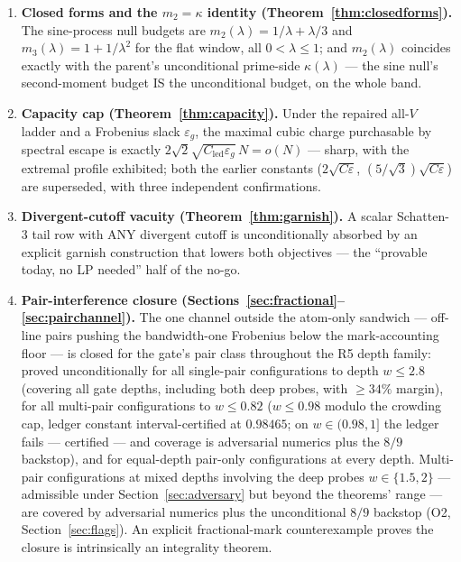 \documentclass[11pt]{article}
\theoremstyle{plain}
\theoremstyle{definition}
\theoremstyle{remark}
\newcommand{\Cled}{C_{\mathrm{led}}}
\begin{document}
\begin{enumerate}
\item \textbf{Closed forms and the $m_2 = \kappa$ identity
(Theorem~\ref{thm:closedforms}).} The sine-process null budgets are
$m_2(\lambda) = 1/\lambda + \lambda/3$ and $m_3(\lambda) = 1 + 1/\lambda^2$ for
the flat window, all $0 < \lambda \le 1$; and $m_2(\lambda)$ coincides exactly
with the parent's unconditional prime-side $\kappa(\lambda)$ --- the sine null's
second-moment budget IS the unconditional budget, on the whole band.

\item \textbf{Capacity cap (Theorem~\ref{thm:capacity}).} Under the repaired
all-$V$ ladder and a Frobenius slack $\varepsilon_g$, the maximal cubic charge
purchasable by spectral escape is exactly
$2\sqrt{2}\sqrt{\Cled \varepsilon_g}\,N = o(N)$ --- sharp, with the extremal
profile exhibited; both the earlier constants
($2\sqrt{C\varepsilon}$, $(5/\sqrt{3})\sqrt{C\varepsilon}$) are superseded, with
three independent confirmations.

\item \textbf{Divergent-cutoff vacuity (Theorem~\ref{thm:garnish}).} A scalar
Schatten-$3$ tail row with ANY divergent cutoff is unconditionally absorbed by an
explicit garnish construction that lowers both objectives --- the ``provable
today, no LP needed'' half of the no-go.

\item \textbf{Pair-interference closure
(Sections~\ref{sec:fractional}--\ref{sec:pairchannel}).} The one channel outside
the atom-only sandwich --- off-line pairs pushing the bandwidth-one Frobenius
below the mark-accounting floor --- is closed for the gate's pair class
throughout the R5 depth family: proved unconditionally for all single-pair
configurations to depth $w \le 2.8$ (covering all gate depths, including both
deep probes, with $\ge 34\%$ margin), for all multi-pair configurations to
$w \le 0.82$ ($w \le 0.98$ modulo the crowding cap, ledger constant
interval-certified at $0.98465$; on $w \in (0.98, 1]$ the ledger fails ---
certified --- and coverage is adversarial numerics plus the $8/9$ backstop), and
for equal-depth pair-only configurations at every depth. Multi-pair
configurations at mixed depths involving the deep probes $w \in \{1.5, 2\}$ ---
admissible under Section~\ref{sec:adversary} but beyond the theorems' range ---
are covered by adversarial numerics plus the unconditional $8/9$ backstop (O2,
Section~\ref{sec:flags}). An explicit fractional-mark counterexample proves the
closure is intrinsically an integrality theorem.
\end{enumerate}
\end{document}
